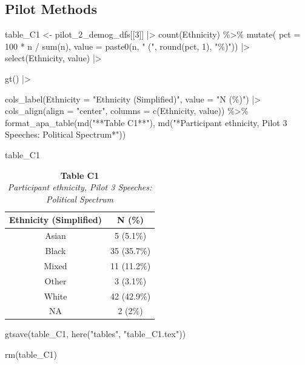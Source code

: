 \documentclass[
  man]{apa7}
\newenvironment{Shaded}{\begin{snugshade}}{\end{snugshade}}
\newcommand{\AttributeTok}[1]{\textcolor[rgb]{0.40,0.45,0.13}{#1}}
\newcommand{\DecValTok}[1]{\textcolor[rgb]{0.68,0.00,0.00}{#1}}
\newcommand{\FunctionTok}[1]{\textcolor[rgb]{0.28,0.35,0.67}{#1}}
\newcommand{\NormalTok}[1]{\textcolor[rgb]{0.00,0.23,0.31}{#1}}
\newcommand{\OtherTok}[1]{\textcolor[rgb]{0.00,0.23,0.31}{#1}}
\newcommand{\SpecialCharTok}[1]{\textcolor[rgb]{0.37,0.37,0.37}{#1}}
\newcommand{\StringTok}[1]{\textcolor[rgb]{0.13,0.47,0.30}{#1}}
\begin{document}
\subsection{Pilot Methods}\label{pilot-methods-1}

\begin{Shaded}
\begin{Highlighting}[]
\NormalTok{table\_C1 }\OtherTok{\textless{}{-}}\NormalTok{ pilot\_2\_demog\_dfs[[}\DecValTok{3}\NormalTok{]] }\SpecialCharTok{|\textgreater{}} 
    \FunctionTok{count}\NormalTok{(Ethnicity) }\SpecialCharTok{\%\textgreater{}\%}
    \FunctionTok{mutate}\NormalTok{(}
      \AttributeTok{pct =} \DecValTok{100} \SpecialCharTok{*}\NormalTok{ n }\SpecialCharTok{/} \FunctionTok{sum}\NormalTok{(n),}
      \AttributeTok{value =} \FunctionTok{paste0}\NormalTok{(n, }\StringTok{" ("}\NormalTok{, }\FunctionTok{round}\NormalTok{(pct, }\DecValTok{1}\NormalTok{), }\StringTok{"\%)"}\NormalTok{)) }\SpecialCharTok{|\textgreater{}} 
  \FunctionTok{select}\NormalTok{(Ethnicity, value) }\SpecialCharTok{|\textgreater{}}
  
  \FunctionTok{gt}\NormalTok{() }\SpecialCharTok{|\textgreater{}}
  
  \FunctionTok{cols\_label}\NormalTok{(}\AttributeTok{Ethnicity =} \StringTok{"Ethnicity (Simplified)"}\NormalTok{, }\AttributeTok{value =} \StringTok{"N (\%)"}\NormalTok{) }\SpecialCharTok{|\textgreater{}}
  \FunctionTok{cols\_align}\NormalTok{(}\AttributeTok{align =} \StringTok{"center"}\NormalTok{, }\AttributeTok{columns =} \FunctionTok{c}\NormalTok{(Ethnicity, value)) }\SpecialCharTok{\%\textgreater{}\%}
  \FunctionTok{format\_apa\_table}\NormalTok{(}\FunctionTok{md}\NormalTok{(}\StringTok{"**Table C1**"}\NormalTok{), }\FunctionTok{md}\NormalTok{(}\StringTok{"*Participant ethnicity, Pilot 3 Speeches: Political Spectrum*"}\NormalTok{))}

\NormalTok{table\_C1}
\end{Highlighting}
\end{Shaded}

\begin{table}
\caption*{
{\large \textbf{Table C1}} \\ 
{\small \emph{Participant ethnicity, Pilot 3 Speeches: Political Spectrum}}
} 
\fontsize{9.0pt}{10.8pt}\selectfont
\begin{tabular*}{\linewidth}{@{\extracolsep{\fill}}cc}
\toprule
Ethnicity (Simplified) & N (\%) \\ 
\midrule\addlinespace[2.5pt]
Asian & 5 (5.1\%) \\ 
Black & 35 (35.7\%) \\ 
Mixed & 11 (11.2\%) \\ 
Other & 3 (3.1\%) \\ 
White & 42 (42.9\%) \\ 
NA & 2 (2\%) \\ 
\bottomrule
\end{tabular*}
\end{table}

\begin{Shaded}
\begin{Highlighting}[]
\FunctionTok{gtsave}\NormalTok{(table\_C1, }\FunctionTok{here}\NormalTok{(}\StringTok{"tables"}\NormalTok{, }\StringTok{"table\_C1.tex"}\NormalTok{))}

\FunctionTok{rm}\NormalTok{(table\_C1)}
\end{Highlighting}
\end{Shaded}
\end{document}
